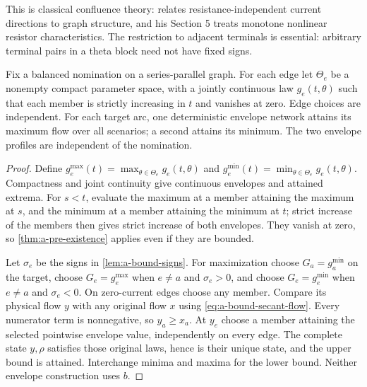 This is classical confluence theory: \citet[Theorems 0 and 1]{duffin1965-topology-of-series-parallel-networks}
relates resistance-independent current directions to graph structure,
and his Section 5 treats monotone nonlinear resistor characteristics.
The restriction to adjacent terminals is essential: arbitrary terminal
pairs in a theta block need not have fixed signs.

\begin{theorem}
\label{thm:a-bound-envelope-structural}
Fix a balanced nomination on a series-parallel graph. For each edge
let $\Theta_e$ be a nonempty compact parameter space, with a jointly
continuous law $g_e(t,\theta)$ such that each member is strictly
increasing in $t$ and vanishes at zero. Edge choices are independent.
For each target arc, one deterministic envelope network attains its
maximum flow over all scenarios; a second attains its minimum.
The two envelope profiles are independent of the nomination.
\end{theorem}
\begin{proof}
Define $g_e^{\max}(t)=\max_{\theta\in\Theta_e}g_e(t,\theta)$ and
$g_e^{\min}(t)=\min_{\theta\in\Theta_e}g_e(t,\theta)$.
Compactness and joint continuity give continuous envelopes and attained
extrema. For $s<t$, evaluate the maximum at a member attaining the
maximum at $s$, and the minimum at a member attaining the minimum at
$t$; strict increase of the members then gives strict increase of both
envelopes. They vanish at zero, so \cref{thm:a-pre-existence} applies
even if they are bounded.

Let $\sigma_e$ be the signs in \cref{lem:a-bound-signs}. For maximization
choose $G_a=g_a^{\min}$ on the target, choose $G_e=g_e^{\max}$ when
$e\ne a$ and $\sigma_e>0$, and choose $G_e=g_e^{\min}$ when
$e\ne a$ and $\sigma_e<0$. On zero-current edges choose any member.
Compare its physical flow $y$ with any original flow $x$ using
\cref{eq:a-bound-secant-flow}. Every numerator term is nonnegative,
so $y_a\ge x_a$. At $y_e$ choose a member attaining the selected
pointwise envelope value, independently on every edge. The complete
state $y,\rho$ satisfies those original laws, hence is their unique
state, and the upper bound is attained. Interchange minima and maxima
for the lower bound. Neither envelope construction uses $b$.
\end{proof}

